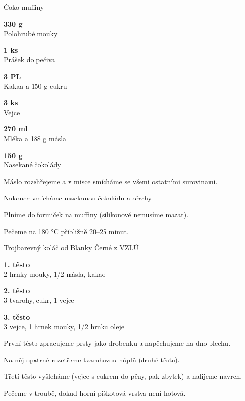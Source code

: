 \documentclass[11pt,a4paper]{article}
\begin{document}
\begin{recipe}[Sienna]{Čoko muffiny}
    \begin{ingredients}
        \item \parbox[t]{\linewidth}{\raggedright \weight \textbf{330 g}\\ Polohrubé mouky}
        \item \parbox[t]{\linewidth}{\raggedright \piece \textbf{1 ks}\\ Prášek do pečiva}
        \item \parbox[t]{\linewidth}{\raggedright \spoon \textbf{3 PL}\\ Kakaa a 150 g cukru}
        \item \parbox[t]{\linewidth}{\raggedright \piece \textbf{3 ks}\\ Vejce}
        \item \parbox[t]{\linewidth}{\raggedright \liquid \textbf{270 ml}\\ Mléka a 188 g másla}
        \item \parbox[t]{\linewidth}{\raggedright \weight \textbf{150 g}\\ Nasekané čokolády}
    \end{ingredients}
    \begin{steps}
        \item Máslo rozehřejeme a v misce smícháme se všemi ostatními surovinami.
        \item Nakonec vmícháme nasekanou čokoládu a ořechy.
        \item Plníme do formiček na muffiny (silikonové nemusíme mazat).
        \item Pečeme na 180 °C přibližně 20–25 minut.
    \end{steps}
\end{recipe}

\begin{recipe}[DarkOrchid]{Trojbarevný koláč od Blanky Černé z VZLÚ}
    \begin{ingredients}
        \item \parbox[t]{\linewidth}{\raggedright \piece \textbf{1. těsto}\\ 2 hrnky mouky, 1/2 másla, kakao}
        \item \parbox[t]{\linewidth}{\raggedright \piece \textbf{2. těsto}\\ 3 tvarohy, cukr, 1 vejce}
        \item \parbox[t]{\linewidth}{\raggedright \piece \textbf{3. těsto}\\ 3 vejce, 1 hrnek mouky, 1/2 hrnku oleje}
    \end{ingredients}
    \begin{steps}
        \item První těsto zpracujeme prsty jako drobenku a napěchujeme na dno plechu.
        \item Na něj opatrně rozetřeme tvarohovou náplň (druhé těsto).
        \item Třetí těsto vyšleháme (vejce s cukrem do pěny, pak zbytek) a nalijeme navrch.
        \item Pečeme v troubě, dokud horní piškotová vrstva není hotová.
    \end{steps}
\end{recipe}
\end{document}
